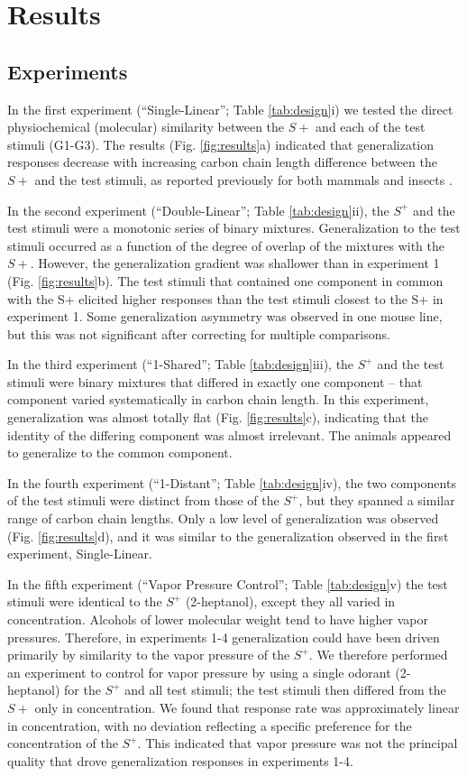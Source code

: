 \section*{Results}
\label{results}
\subsection*{Experiments}
\label{results_experiments}
In the first experiment (``Single-Linear''; Table \ref{tab:design}i) we tested the direct physiochemical (molecular) similarity between the $S+$ and each of the test stimuli (G1-G3). 
The results (Fig. \ref{fig:results}a) indicated that generalization responses decrease with increasing carbon chain length difference between the $S+$ and the test stimuli, as reported previously for both mammals and insects \cite{18810459}\cite{24488965}\cite{11551996}\cite{19129384}.  

In the second experiment (``Double-Linear''; Table \ref{tab:design}ii), the $S^+$ and the test stimuli were a monotonic series of binary mixtures.
Generalization to the test stimuli occurred as a function of the degree of overlap of the mixtures with the $S+$. 
However, the generalization gradient was shallower than in experiment 1 (Fig. \ref{fig:results}b). 
The test stimuli that contained one component in common with the S+ elicited higher responses than the test stimuli closest to the S+ in experiment 1. 
Some generalization asymmetry was observed in one mouse line, but this was not significant after correcting for multiple comparisons.   

In the third experiment (``1-Shared''; Table \ref{tab:design}iii), the $S^+$ and the test stimuli were binary mixtures that differed in exactly one component -- that component varied systematically in carbon chain length.  
In this experiment, generalization was almost totally flat (Fig. \ref{fig:results}c), indicating that the identity of the differing component was almost irrelevant.  
The animals appeared to generalize to the common component.  

In the fourth experiment (``1-Distant''; Table \ref{tab:design}iv), the two components of the test stimuli were distinct from those of the $S^+$, but they spanned a similar range of carbon chain lengths. 
Only a low level of generalization was observed (Fig. \ref{fig:results}d), and it was similar to the generalization observed in the first experiment, Single-Linear.  

In the fifth experiment (``Vapor Pressure Control''; Table \ref{tab:design}v) the test stimuli were identical to the $S^+$ (2-heptanol), except they all varied in concentration.  
Alcohols of lower molecular weight tend to have higher vapor pressures.  
Therefore, in experiments 1-4 generalization could have been driven primarily by similarity to the vapor pressure of the $S^+$.  
We therefore performed an experiment to control for vapor pressure by using a single odorant (2-heptanol) for the $S^+$ and all test stimuli; the test stimuli then differed from the $S+$ only in concentration.  
We found that response rate was approximately linear in concentration, with no deviation reflecting a specific preference for the concentration of the $S^+$.  
This indicated that vapor pressure was not the principal quality that drove generalization responses in experiments 1-4.  